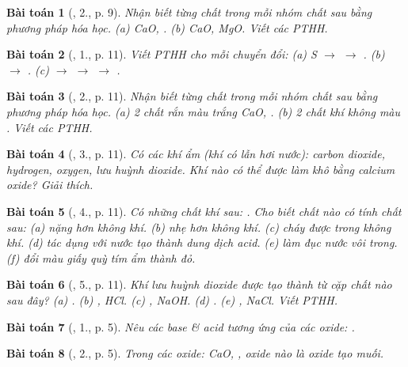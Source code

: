 \documentclass{article}
\newtheorem{baitoan}{Bài toán}
\begin{document}
\begin{baitoan}[\cite{SGK_Hoa_Hoc_9}, 2., p. 9]
	Nhận biết từng chất trong mỗi nhóm chất sau bằng phương pháp hóa học. (a) \emph{CaO, }. (b) \emph{CaO, MgO}. Viết các PTHH.
\end{baitoan}

\begin{baitoan}[\cite{SGK_Hoa_Hoc_9}, 1., p. 11]
	Viết PTHH cho mỗi chuyển đổi: (a) \emph{S $\to$  $\to$ }. (b) \emph{ $\to$ }. (c) \emph{ $\to$  $\to$  $\to$ }.
\end{baitoan}

\begin{baitoan}[\cite{SGK_Hoa_Hoc_9}, 2., p. 11]
	Nhận biết từng chất trong mỗi nhóm chất sau bằng phương pháp hóa học. (a) 2 chất rắn màu trắng \emph{CaO, }. (b) 2 chất khí không màu \emph{}. Viết các PTHH.
\end{baitoan}

\begin{baitoan}[\cite{SGK_Hoa_Hoc_9}, 3., p. 11]
	Có các khí ẩm (khí có lẫn hơi nước): carbon dioxide, hydrogen, oxygen, lưu huỳnh dioxide. Khí nào có thể được làm khô bằng calcium oxide? Giải thích.
\end{baitoan}

\begin{baitoan}[\cite{SGK_Hoa_Hoc_9}, 4., p. 11]
	Có những chất khí sau: \emph{}. Cho biết chất nào có tính chất sau: (a) nặng hơn không khí. (b) nhẹ hơn không khí. (c) cháy được trong không khí. (d) tác dụng với nước tạo thành dung dịch acid. (e) làm đục nước vôi trong. (f) đổi màu giấy quỳ tím ẩm thành đỏ.
\end{baitoan}

\begin{baitoan}[\cite{SGK_Hoa_Hoc_9}, 5., p. 11]
	Khí lưu huỳnh dioxide được tạo thành từ cặp chất nào sau đây? (a) \emph{}. (b) \emph{, HCl}. (c) \emph{, NaOH}. (d) \emph{}. (e) \emph{, NaCl}. Viết PTHH.
\end{baitoan}

\begin{baitoan}[\cite{An_350_BT_Hoa_Hoc_9}, 1., p. 5]
	Nêu các base \& acid tương ứng của các oxide: \emph{}.
\end{baitoan}

\begin{baitoan}[\cite{An_350_BT_Hoa_Hoc_9}, 2., p. 5]
	Trong các oxide: \emph{CaO, }, oxide nào là oxide tạo muối.
\end{baitoan}
\end{document}
